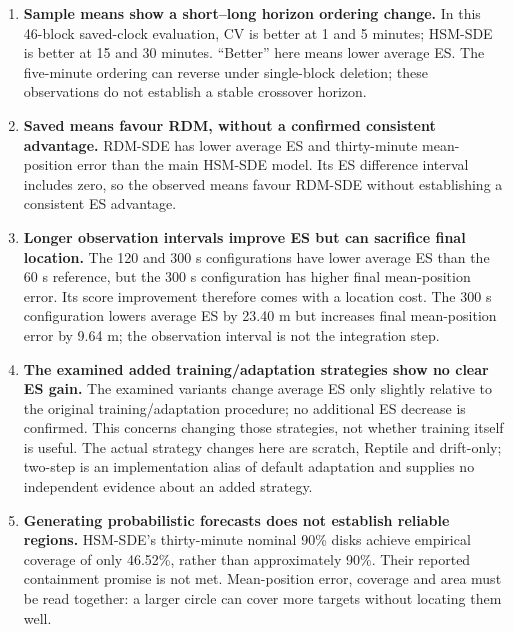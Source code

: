 \begin{enumerate}
\renewcommand{\labelenumi}{\arabic{enumi}.}
\item \textbf{Sample means show a short--long horizon ordering change.}
In this 46-block saved-clock evaluation, CV is better at 1 and 5 minutes;
HSM-SDE is better at 15 and 30 minutes. ``Better'' here means lower average ES.
The five-minute ordering can reverse under single-block deletion; these
observations do not establish a stable crossover horizon.

\item \textbf{Saved means favour RDM, without a confirmed consistent advantage.}
RDM-SDE has lower average ES and thirty-minute mean-position error than
the main HSM-SDE model. Its ES difference interval includes zero, so the
observed means favour RDM-SDE without establishing a consistent ES advantage.

\item \textbf{Longer observation intervals improve ES but can sacrifice final location.}
The 120 and 300 s configurations have lower average ES than the 60 s
reference, but the 300 s configuration has higher final mean-position
error. Its score improvement therefore comes with a location cost.
The 300 s configuration lowers average ES by 23.40 m but increases final
mean-position error by 9.64 m; the observation interval is not the integration step.

\item \textbf{The examined added training/adaptation strategies show no clear ES gain.}
The examined variants change average ES only slightly relative to the
original training/adaptation procedure; no additional ES decrease is
confirmed. This concerns changing those strategies, not whether training
itself is useful.
The actual strategy changes here are scratch, Reptile and drift-only;
two-step is an implementation alias of default adaptation and supplies
no independent evidence about an added strategy.

\item \textbf{Generating probabilistic forecasts does not establish reliable regions.}
HSM-SDE's thirty-minute nominal 90\% disks achieve empirical coverage of
only 46.52\%, rather than approximately 90\%. Their reported containment
promise is not met. Mean-position error, coverage and area must be read
together: a larger circle can cover more targets without locating them well.


\end{enumerate}
